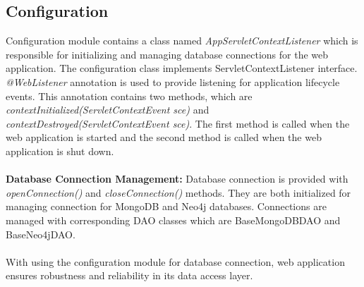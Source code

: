 \subsection*{Configuration}
Configuration module contains a class named \textit{AppServletContextListener} which is responsible for 
initializing and managing database connections for the web application. The configuration class 
implements ServletContextListener interface. \textit{@WebListener} annotation is used to provide listening for 
application lifecycle events. This annotation contains two methods, which are \textit{contextInitialized(ServletContextEvent sce)} and
\textit{contextDestroyed(ServletContextEvent sce)}. The first method is called when the web application is started and the second method is called when the web application is shut down.\\ \\
\textbf{Database Connection Management:} Database connection is provided with \textit{openConnection()} and \textit{closeConnection()} methods. They are both initialized for managing connection
for MongoDB and Neo4j databases. Connections are managed with corresponding DAO classes which are BaseMongoDBDAO and BaseNeo4jDAO.\\ \\
With using the configuration module for database connection, web application ensures robustness and reliability in its data access layer.

